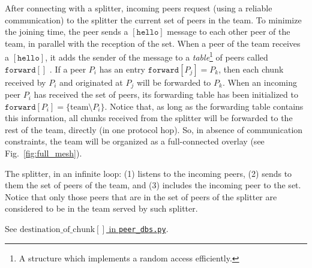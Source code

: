 

\label{sec:joining}

After connecting with a splitter, incoming peers request (using a
reliable communication) to the splitter the current set of peers in
the team. To minimize the joining time, the peer sends a
$[\mathtt{hello}]$ message to each other peer of the team, in parallel
with the reception of the set. When a peer of the team receives a
$[\mathtt{hello}]$, it adds the sender of the message to a
\emph{table}\footnote{A structure which implements a random access
  efficiently.} of peers called $\mathtt{forward}[]$ . If a peer $P_i$ has an entry
$\mathtt{forward}[P_j]=P_k$, then each chunk received by $P_i$ and
originated at $P_j$ will be forwarded to $P_k$. When an incoming peer
$P_i$ has received the set of peers, its forwarding table has been
initialized to $\mathtt{forward}[P_i]=\{\text{team}\setminus
P_i\}$. Notice that, as long as the forwarding table contains this
information, all chunks received from the splitter will be forwarded
to the rest of the team, directly (in one protocol hop). So, in
absence of communication constraints, the team will be organized as a
full-connected overlay (see Fig.~\ref{fig:full_mesh}).


The splitter, in an infinite loop: (1) listens to the incoming peers,
(2) sends to them the set of peers of the team, and (3) includes the
incoming peer to the set. Notice that only those peers that are in
the set of peers of the splitter are considered to be in the team
served by such splitter.

\begin{comment}
\begin{figure*}
  \fig{1000}{10cm}{joining} \caption{Code related to team
    joining.\label{fig:joining}}
\end{figure*}

The new pseudo-code related to joining a team is describen in the
Fig.~\ref{fig:joining}.
\end{comment}

\begin{notex}
  See \href{https://github.com/P2PSP/simulator/blob/f0c73be1817e7d3b816cc61cd2c8e59b17f9a0e6/src/core/splitter_dbs.py#L296}{$\text{destination\_of\_chunk}[]$ in \texttt{peer\_dbs.py}}.
\end{notex}
